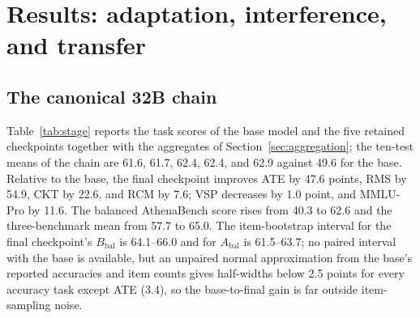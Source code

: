 \documentclass[twocolumn]{svjour3}
\newcommand{\Abal}{A_{\mathrm{bal}}}
\newcommand{\Bbal}{B_{\mathrm{bal}}}
\begin{document}
\section{Results: adaptation, interference, and transfer}\label{sec:results}
\subsection{The canonical 32B chain}
Table~\ref{tab:stage} reports the task scores of the base model and the five retained checkpoints together with the aggregates of Section~\ref{sec:aggregation}; the ten-test means of the chain are 61.6, 61.7, 62.4, 62.4, and 62.9 against 49.6 for the base. Relative to the base, the final checkpoint improves ATE by 47.6 points, RMS by 54.9, CKT by 22.6, and RCM by 7.6; VSP decreases by 1.0 point, and MMLU-Pro by 11.6. The balanced AthenaBench score rises from 40.3 to 62.6 and the three-benchmark mean from 57.7 to 65.0. The item-bootstrap interval for the final checkpoint's $\Bbal$ is 64.1--66.0 and for $\Abal$ is 61.5--63.7; no paired interval with the base is available, but an unpaired normal approximation from the base's reported accuracies and item counts gives half-widths below 2.5 points for every accuracy task except ATE (3.4), so the base-to-final gain is far outside item-sampling noise.
\end{document}

